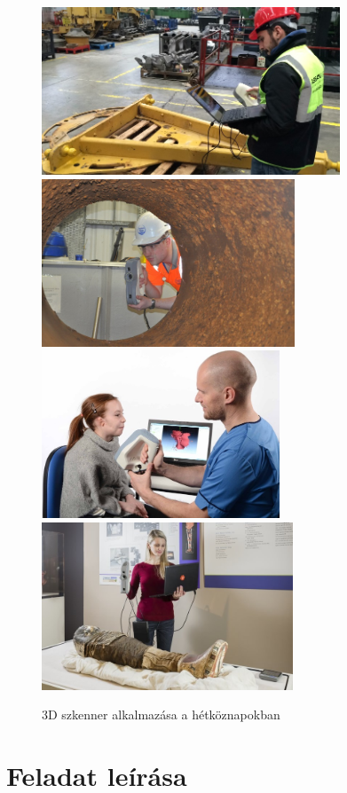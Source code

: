 \documentclass[12pt,a4paper]{article}
\begin{document}
\begin{figure}[h!]
\centering
\includegraphics[height=5cm]{images/application1.jpg}
\includegraphics[height=5cm]{images/application2.jpg}
\includegraphics[height=5cm]{images/application3.jpg}
\includegraphics[height=5cm]{images/application4.jpg}
\caption{3D szkenner alkalmazása a hétköznapokban\cite{alkalmazasok}}
\end{figure}
\newpage
\section{Feladat leírása}
\end{document}
